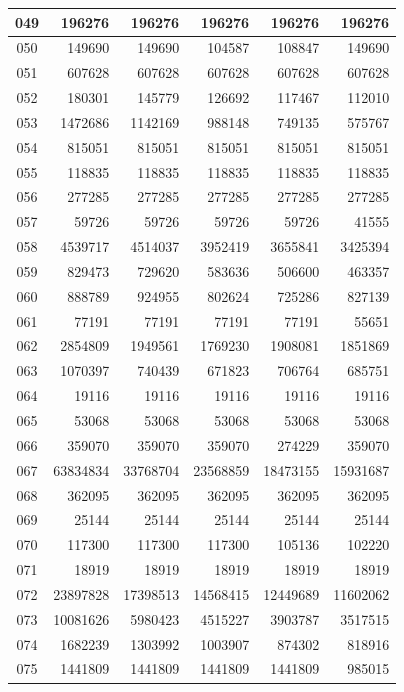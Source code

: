 \begin{longtable}{|c|r|r|r|r|r|}
\hline
049 & 196276 & 196276 & 196276 & 196276 & 196276 \\
\hline
050 & 149690 & 149690 & 104587 & 108847 & 149690 \\
\hline
051 & 607628 & 607628 & 607628 & 607628 & 607628 \\
\hline
052 & 180301 & 145779 & 126692 & 117467 & 112010 \\
\hline
053 & 1472686 & 1142169 & 988148 & 749135 & 575767 \\
\hline
054 & 815051 & 815051 & 815051 & 815051 & 815051 \\
\hline
055 & 118835 & 118835 & 118835 & 118835 & 118835 \\
\hline
056 & 277285 & 277285 & 277285 & 277285 & 277285 \\
\hline
057 & 59726 & 59726 & 59726 & 59726 & 41555 \\
\hline
058 & 4539717 & 4514037 & 3952419 & 3655841 & 3425394 \\
\hline
059 & 829473 & 729620 & 583636 & 506600 & 463357 \\
\hline
060 & 888789 & 924955 & 802624 & 725286 & 827139 \\
\hline
061 & 77191 & 77191 & 77191 & 77191 & 55651 \\
\hline
062 & 2854809 & 1949561 & 1769230 & 1908081 & 1851869 \\
\hline
063 & 1070397 & 740439 & 671823 & 706764 & 685751 \\
\hline
064 & 19116 & 19116 & 19116 & 19116 & 19116 \\
\hline
065 & 53068 & 53068 & 53068 & 53068 & 53068 \\
\hline
066 & 359070 & 359070 & 359070 & 274229 & 359070 \\
\hline
067 & 63834834 & 33768704 & 23568859 & 18473155 & 15931687 \\
\hline
068 & 362095 & 362095 & 362095 & 362095 & 362095 \\
\hline
069 & 25144 & 25144 & 25144 & 25144 & 25144 \\
\hline
070 & 117300 & 117300 & 117300 & 105136 & 102220 \\
\hline
071 & 18919 & 18919 & 18919 & 18919 & 18919 \\
\hline
072 & 23897828 & 17398513 & 14568415 & 12449689 & 11602062 \\
\hline
073 & 10081626 & 5980423 & 4515227 & 3903787 & 3517515 \\
\hline
074 & 1682239 & 1303992 & 1003907 & 874302 & 818916 \\
\hline
075 & 1441809 & 1441809 & 1441809 & 1441809 & 985015 \\

\end{longtable}

